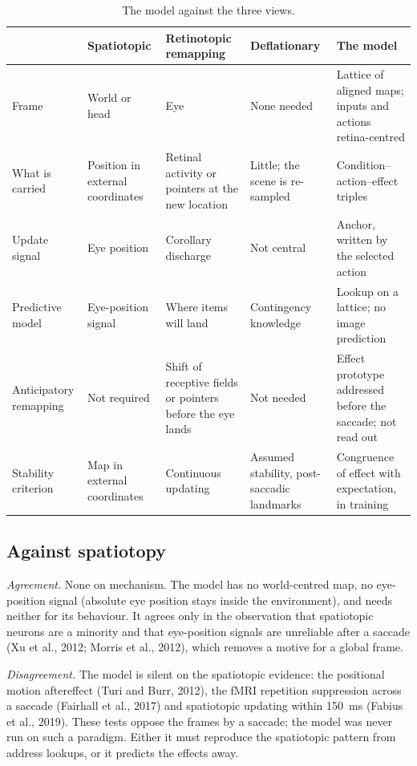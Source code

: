 \documentclass[11pt,a4paper]{article}
\newcommand{\ra}{\raggedright\arraybackslash}
\begin{document}
\begin{table}[h]
\centering\footnotesize
\setlength{\tabcolsep}{3pt}
\begin{tabular}{@{}>{\ra}p{2.2cm}>{\ra}p{2.7cm}>{\ra}p{2.7cm}>{\ra}p{2.7cm}>{\ra}p{3.2cm}@{}}
\toprule
& Spatiotopic & Retinotopic remapping & Deflationary & The model \\
\midrule
Frame & World or head & Eye & None needed & Lattice of aligned maps; inputs and actions retina-centred \\
What is carried & Position in external coordinates & Retinal activity or pointers at the new location & Little; the scene is re-sampled & Condition--action--effect triples \\
Update signal & Eye position & Corollary discharge & Not central & Anchor, written by the selected action \\
Predictive model & Eye-position signal & Where items will land & Contingency knowledge & Lookup on a lattice; no image prediction \\
Anticipatory remapping & Not required & Shift of receptive fields or pointers before the eye lands & Not needed & Effect prototype addressed before the saccade; not read out \\
Stability criterion & Map in external coordinates & Continuous updating & Assumed stability, post-saccadic landmarks & Congruence of effect with expectation, in training \\
\bottomrule
\end{tabular}
\caption{The model against the three views.}
\label{tab:views}
\end{table}

\subsection{Against spatiotopy}

\emph{Agreement.} None on mechanism. The model has no world-centred map, no
eye-position signal (absolute eye position stays inside the environment), and
needs neither for its behaviour. It agrees only in the observation that
spatiotopic neurons are a minority and that eye-position signals are unreliable
after a saccade (Xu et al., 2012; Morris et al., 2012), which removes a motive for
a global frame.

\emph{Disagreement.} The model is silent on the spatiotopic evidence: the positional
motion aftereffect (Turi and Burr, 2012), the fMRI repetition suppression across a
saccade (Fairhall et al., 2017) and spatiotopic updating within 150~ms (Fabius et
al., 2019). These tests oppose the frames by a saccade; the model was never run on
such a paradigm. Either it must reproduce the spatiotopic pattern from address
lookups, or it predicts the effects away.
\end{document}
